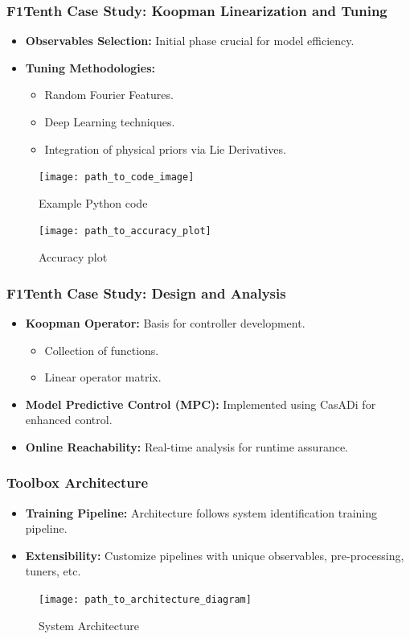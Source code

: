 \documentclass[shortpres,aspectratio=43]{beamer}
\begin{document}
\begin{frame}
\frametitle{F1Tenth Case Study: Koopman Linearization and Tuning}
\begin{itemize}
    \item<1-> \textbf{Observables Selection:} Initial phase crucial for model efficiency.
    \item<2-> \textbf{Tuning Methodologies:} 
    \begin{itemize}
        \item Random Fourier Features.
        \item Deep Learning techniques.
        \item Integration of physical priors via Lie Derivatives.
    \end{itemize}
\end{itemize}
\begin{figure}
  \centering
  \texttt{[image: path\_to\_code\_image]} %
  \caption{Example Python code}
\end{figure}
\begin{figure}
  \centering
  \texttt{[image: path\_to\_accuracy\_plot]} %
  \caption{Accuracy plot}
\end{figure}
\end{frame}

\begin{frame}
\frametitle{F1Tenth Case Study: Design and Analysis}
\begin{itemize}
    \item<1-> \textbf{Koopman Operator:} Basis for controller development.
    \begin{itemize}
        \item Collection of functions.
        \item Linear operator matrix.
    \end{itemize}
    \item<2-> \textbf{Model Predictive Control (MPC):} Implemented using CasADi for enhanced control.
    \item<3-> \textbf{Online Reachability:} Real-time analysis for runtime assurance.
\end{itemize}
\end{frame}

\begin{frame}
\frametitle{Toolbox Architecture}
\begin{itemize}
    \item<1-> \textbf{Training Pipeline:} Architecture follows system identification training pipeline.
    \item<2-> \textbf{Extensibility:} Customize pipelines with unique observables, pre-processing, tuners, etc.
\end{itemize}
\begin{figure}
  \centering
  \texttt{[image: path\_to\_architecture\_diagram]} %
  \caption{System Architecture}
\end{figure}
\end{frame}
\end{document}
